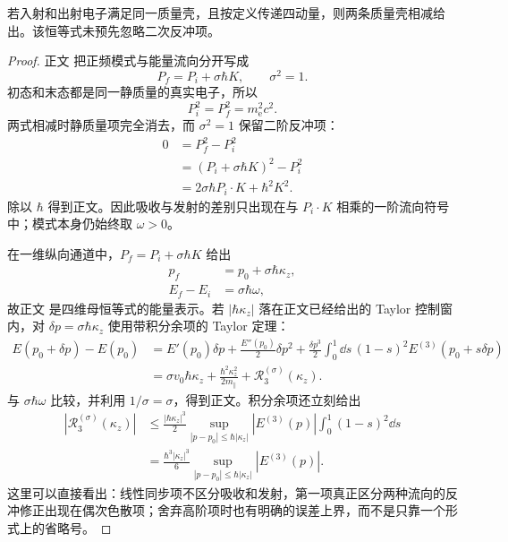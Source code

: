 \begin{proposition}[质量壳上的反冲相位匹配]
若入射和出射电子满足同一质量壳，且按定义传递四动量，则两条质量壳相减给出。该恒等式未预先忽略二次反冲项。
\end{proposition}
\begin{proof}
正文 把正频模式与能量流向分开写成
\[
P_f=P_i+\sigma\hbar K,
\qquad \sigma^2=1.
\]
初态和末态都是同一静质量的真实电子，所以
\[
P_i^2=P_f^2=m_{\mathrm e}^2c^2.
\]
两式相减时静质量项完全消去，而 $\sigma^2=1$ 保留二阶反冲项：
\begin{align*}
0
&=P_f^2-P_i^2\\
&=(P_i+\sigma\hbar K)^2-P_i^2\\
&=2\sigma\hbar P_i\!\cdot K+\hbar^2K^2.
\end{align*}
除以 $\hbar$ 得到正文。因此吸收与发射的差别只出现在与 $P_i\!\cdot K$ 相乘的一阶流向符号中；模式本身仍始终取 $\omega>0$。

在一维纵向通道中，$P_f=P_i+\sigma\hbar K$ 给出
\begin{align*}
p_f&=p_0+\sigma\hbar\kappa_z,\\
E_f-E_i&=\sigma\hbar\omega,
\end{align*}
故正文 是四维母恒等式的能量表示。若 $|\hbar\kappa_z|$ 落在正文已经给出的 Taylor 控制窗内，对
$\delta p=\sigma\hbar\kappa_z$ 使用带积分余项的 Taylor 定理：
\begin{align*}
E(p_0+\delta p)-E(p_0)
&=E'(p_0)\delta p
+\frac{E''(p_0)}{2}\delta p^2
+\frac{\delta p^3}{2}
\int_0^1\dd s\,(1-s)^2E^{(3)}(p_0+s\delta p)\\
&=\sigma v_0\hbar\kappa_z
+\frac{\hbar^2\kappa_z^2}{2m_\parallel}
+\mathcal R_3^{(\sigma)}(\kappa_z).
\end{align*}
与 $\sigma\hbar\omega$ 比较，并利用 $1/\sigma=\sigma$，得到正文。积分余项还立刻给出
\begin{align*}
\left|\mathcal R_3^{(\sigma)}(\kappa_z)\right|
&\le
\frac{|\hbar\kappa_z|^3}{2}
\sup_{|p-p_0|\le\hbar|\kappa_z|}|E^{(3)}(p)|
\int_0^1(1-s)^2\dd s\\
&=\frac{\hbar^3|\kappa_z|^3}{6}
\sup_{|p-p_0|\le\hbar|\kappa_z|}|E^{(3)}(p)|.
\end{align*}
这里可以直接看出：线性同步项不区分吸收和发射，第一项真正区分两种流向的反冲修正出现在偶次色散项；舍弃高阶项时也有明确的误差上界，而不是只靠一个形式上的省略号。
\end{proof}

